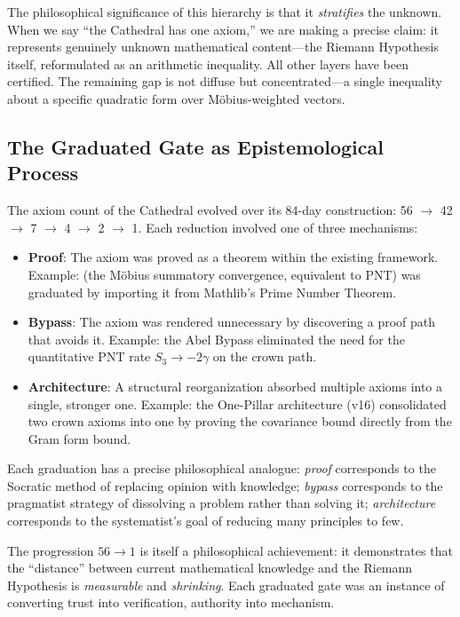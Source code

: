 The philosophical significance of this hierarchy is that it
\emph{stratifies} the unknown. When we say ``the Cathedral has
one axiom,'' we are making a precise claim: it represents
genuinely unknown mathematical content---the Riemann Hypothesis
itself, reformulated as an arithmetic inequality. All other layers
have been certified. The remaining gap is not diffuse
but concentrated---a single inequality about a specific quadratic
form over Möbius-weighted vectors.

\subsection{The Graduated Gate as Epistemological Process}

The axiom count of the Cathedral evolved over its 84-day
construction: 56 $\to$ 42 $\to$ 7 $\to$ 4 $\to$ 2 $\to$ 1.
Each reduction involved one of three mechanisms:

\begin{itemize}
  \item \textbf{Proof}: The axiom was proved as a theorem within
    the existing framework. Example: 
    (the Möbius summatory convergence, equivalent to PNT) was
    graduated by importing it from Mathlib's Prime Number Theorem.

  \item \textbf{Bypass}: The axiom was rendered unnecessary by
    discovering a proof path that avoids it. Example: the Abel
    Bypass eliminated the need for the quantitative PNT rate
    $S_3 \to -2\gamma$ on the crown path.

  \item \textbf{Architecture}: A structural reorganization absorbed
    multiple axioms into a single, stronger one. Example: the
    One-Pillar architecture (v16) consolidated two crown axioms
    into one by proving the covariance bound directly from the
    Gram form bound.
\end{itemize}

Each graduation has a precise philosophical analogue:
\emph{proof} corresponds to the Socratic method of replacing
opinion with knowledge; \emph{bypass} corresponds to the
pragmatist strategy of dissolving a problem rather than solving
it; \emph{architecture} corresponds to the systematist's goal of
reducing many principles to few.

The progression $56 \to 1$ is itself a philosophical achievement:
it demonstrates that the ``distance'' between current mathematical
knowledge and the Riemann Hypothesis is \emph{measurable} and
\emph{shrinking}. Each graduated gate was an instance of converting
trust into verification, authority into mechanism.


